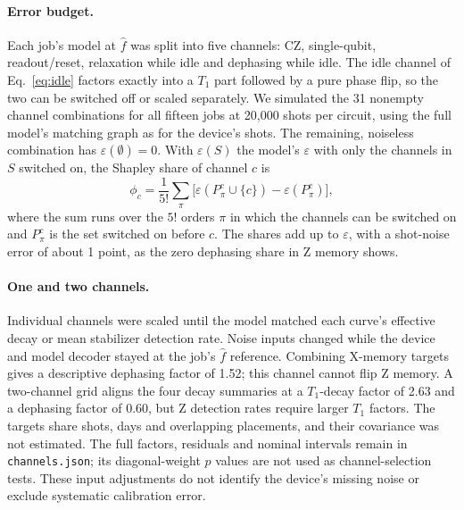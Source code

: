 \documentclass[aps,pra,reprint,nofootinbib,longbibliography,floatfix,showkeys]{revtex4-2}
\newcommand{\eps}{\varepsilon}
\newcommand{\fhat}{\hat f}
\begin{document}
\paragraph*{Error budget.}
Each job's model at $\fhat$ was split into five channels: CZ, single-qubit, readout/reset, relaxation while idle and dephasing while idle.
The idle channel of Eq.~\eqref{eq:idle} factors exactly into a $T_1$ part followed by a pure phase flip, so the two can be switched off or scaled separately.
We simulated the 31 nonempty channel combinations for all fifteen jobs at 20,000 shots per circuit, using the full model's matching graph as for the device's shots.
The remaining, noiseless combination has $\eps(\emptyset)=0$.
With $\eps(S)$ the model's $\eps$ with only the channels in $S$ switched on, the Shapley share of channel $c$ is
\begin{equation}
\phi_c = \frac{1}{5!}\sum_{\pi}\bigl[\eps(P_\pi^c \cup \{c\}) - \eps(P_\pi^c)\bigr] ,
\label{eq:shapley}
\end{equation}
where the sum runs over the $5!$ orders $\pi$ in which the channels can be switched on and $P_\pi^c$ is the set switched on before $c$.
The shares add up to $\eps$, with a shot-noise error of about 1 point, as the zero dephasing share in Z memory shows.

\paragraph*{One and two channels.}
Individual channels were scaled until the model matched each curve's effective decay or mean stabilizer detection rate.
Noise inputs changed while the device and model decoder stayed at the job's $\fhat$ reference.
Combining X-memory targets gives a descriptive dephasing factor of 1.52; this channel cannot flip Z memory.
A two-channel grid aligns the four decay summaries at a $T_1$-decay factor of 2.63 and a dephasing factor of 0.60, but Z detection rates require larger $T_1$ factors.
The targets share shots, days and overlapping placements, and their covariance was not estimated.
The full factors, residuals and nominal intervals remain in \texttt{channels.json}; its diagonal-weight $p$ values are not used as channel-selection tests.
These input adjustments do not identify the device's missing noise or exclude systematic calibration error.
\end{document}
